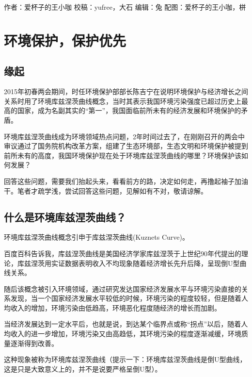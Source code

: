 \documentclass[]{book}
\begin{document}
作者：爱杯子的王小咖
校稿：yufree，大石
编辑：兔
配图：爱杯子的王小咖，栟

\hypertarget{ux73afux5883ux4fddux62a4ux4fddux62a4ux4f18ux5148}{%
\section{环境保护，保护优先}\label{ux73afux5883ux4fddux62a4ux4fddux62a4ux4f18ux5148}}

\hypertarget{ux7f18ux8d77}{%
\subsection{缘起}\label{ux7f18ux8d77}}

2015年初春两会期间，时任环境保护部部长陈吉宁在说明环境保护与经济增长之间关系时用了环境库兹涅茨曲线概念，当时其表示我国环境污染强度已超过历史上最高的国家，成为名副其实的``第一''，我国面临前所未有的经济发展和环境保护的矛盾。

环境库兹涅茨曲线成为环境领域热点问题，2年时间过去了，在刚刚召开的两会中审议通过了国务院机构改革方案，组建了生态环境部，生态文明和环境保护被提到前所未有的高度，我国环境保护现在处于环境库兹涅茨曲线的哪里？环境保护该如何发展？

回答这些问题，需要我们抬起头来，看看前方的路，决定如何走，再撸起袖子加油干。笔者才疏学浅，尝试回答这些问题，见解如有不对，敬请谅解。

\hypertarget{ux4ec0ux4e48ux662fux73afux5883ux5e93ux5179ux6d85ux8328ux66f2ux7ebf}{%
\subsection{什么是环境库兹涅茨曲线？}\label{ux4ec0ux4e48ux662fux73afux5883ux5e93ux5179ux6d85ux8328ux66f2ux7ebf}}

环境库兹涅茨曲线概念引申于库兹涅茨曲线(Kuznets Curve)。

百度百科告诉我，库兹涅茨曲线是美国经济学家库兹涅茨于上世纪90年代提出的理论，库兹涅茨用实证数据表明收入不均现象随着经济增长先升后降，呈现倒U型曲线关系。

随后该概念被引入环境领域，通过研究发达国家经济发展水平与环境污染直接的关系发现，当一个国家经济发展水平较低的时候，环境污染的程度较轻，但是随着人均收入的增加，环境污染由低趋高，环境恶化程度随经济的增长而加剧。

当经济发展达到一定水平后，也就是说，到达某个临界点或称``拐点''以后，随着人均收入的进一步增加，环境污染又由高趋低，其环境污染的程度逐渐减缓，环境质量逐渐得到改善。

这种现象被称为环境库兹涅茨曲线（提示一下：环境库兹涅茨曲线是倒U型曲线，这是只是大致意义上的，并不是说要严格呈倒U型）。
\end{document}
